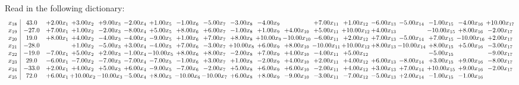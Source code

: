 \documentclass[9pt]{article}
\begin{document}
Read in the following dictionary:
\[\begin{array}{c| c c@{\hskip 2pt} c@{\hskip 2pt} c@{\hskip 2pt} c@{\hskip 2pt} c@{\hskip 2pt} c@{\hskip 2pt} c@{\hskip 2pt} c@{\hskip 2pt} c@{\hskip 2pt} c@{\hskip 2pt} c@{\hskip 2pt} c@{\hskip 2pt} c@{\hskip 2pt} c@{\hskip 2pt} c@{\hskip 2pt} c@{\hskip 2pt} c@{\hskip 2pt} }
 x_{18}   &  43.0 & +  2.00 x_{1} & +  3.00 x_{2} & +  9.00 x_{3} & -2.00 x_{4} & +  1.00 x_{5} & -1.00 x_{6} & -5.00 x_{7} & -3.00 x_{8} & -4.00 x_{9} &   & +  7.00 x_{11} & +  1.00 x_{12} & -6.00 x_{13} & -5.00 x_{14} & -1.00 x_{15} & -4.00 x_{16} & + 10.00 x_{17}\\
 x_{19}   &  -27.0 & +  7.00 x_{1} & +  1.00 x_{2} & -2.00 x_{3} & -8.00 x_{4} & +  5.00 x_{5} & +  8.00 x_{6} & +  6.00 x_{7} & -1.00 x_{8} & +  1.00 x_{9} & +  4.00 x_{10} & +  5.00 x_{11} & + 10.00 x_{12} & +  4.00 x_{13} &   & -10.00 x_{15} & +  8.00 x_{16} & -2.00 x_{17}\\
 x_{20}   &  19.0 & +  8.00 x_{1} & +  4.00 x_{2} & -4.00 x_{3} & -4.00 x_{4} & -9.00 x_{5} & +  1.00 x_{6} & +  7.00 x_{7} & +  8.00 x_{8} & + 10.00 x_{9} & -10.00 x_{10} & -6.00 x_{11} & +  2.00 x_{12} & +  7.00 x_{13} & -5.00 x_{14} & +  7.00 x_{15} & -10.00 x_{16} & +  2.00 x_{17}\\
 x_{21}   &  -28.0  &   & +  1.00 x_{2} & -5.00 x_{3} & +  3.00 x_{4} & -4.00 x_{5} & +  7.00 x_{6} & -3.00 x_{7} & + 10.00 x_{8} & +  6.00 x_{9} & +  8.00 x_{10} & -10.00 x_{11} & + 10.00 x_{12} & +  8.00 x_{13} & -10.00 x_{14} & +  8.00 x_{15} & +  5.00 x_{16} & -3.00 x_{17}\\
 x_{22}   &  -19.0 & -7.00 x_{1} & +  5.00 x_{2} & +  2.00 x_{3} & -1.00 x_{4} & -10.00 x_{5} & +  8.00 x_{6} & +  8.00 x_{7} & -2.00 x_{8} & +  7.00 x_{9} & +  4.00 x_{10} & -4.00 x_{11} & +  5.00 x_{12} &    &   & -5.00 x_{15} &   & -9.00 x_{17}\\
 x_{23}   &  29.0 & -6.00 x_{1} & -7.00 x_{2} & -7.00 x_{3} & -7.00 x_{4} & -7.00 x_{5} & -1.00 x_{6} & +  3.00 x_{7} & +  1.00 x_{8} & -2.00 x_{9} & +  4.00 x_{10} & +  2.00 x_{11} & +  4.00 x_{12} & +  6.00 x_{13} & -8.00 x_{14} & +  3.00 x_{15} & +  9.00 x_{16} & -8.00 x_{17}\\
 x_{24}   &  -33.0 & +  2.00 x_{1} & +  4.00 x_{2} & +  5.00 x_{3} & +  6.00 x_{4} & -9.00 x_{5} & -7.00 x_{6} & -2.00 x_{7} & +  5.00 x_{8} & +  6.00 x_{9} & +  6.00 x_{10} & -2.00 x_{11} & +  4.00 x_{12} & +  3.00 x_{13} & +  7.00 x_{14} & + 10.00 x_{15} & +  9.00 x_{16} & -2.00 x_{17}\\
 x_{25}   &  72.0 & +  6.00 x_{1} & + 10.00 x_{2} & -10.00 x_{3} & -5.00 x_{4} & +  8.00 x_{5} & -10.00 x_{6} & -10.00 x_{7} & +  6.00 x_{8} & +  8.00 x_{9} & -9.00 x_{10} & -3.00 x_{11} & -7.00 x_{12} & -5.00 x_{13} & +  2.00 x_{14} & -1.00 x_{15} & -1.00 x_{16} &   \\

\end{array}\]
\end{document}
